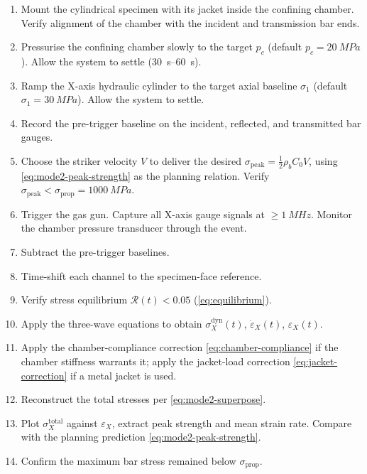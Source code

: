 \documentclass[11pt,a4paper,openany]{book}
\providecommand{\SI}[2]{\qty{#1}{#2}}
\providecommand{\SIrange}[3]{\qtyrange{#1}{#2}{#3}}
\theoremstyle{handbook}
\newcommand{\sig}{\sigma}
\newcommand{\eps}{\varepsilon}
\newcommand{\epsdot}{\dot\eps}
\newcommand{\Cz}{C_0}
\newcommand{\sigprop}{\sig_{\text{prop}}}
\newcommand{\sigpeak}{\sig_{\text{peak}}}
\begin{document}
\begin{stepbox}
\begin{enumerate}[leftmargin=*,itemsep=3pt]
  \item Mount the cylindrical specimen with its jacket inside the
        confining chamber. Verify alignment of the chamber with the
        incident and transmission bar ends.
  \item Pressurise the confining chamber slowly to the target $p_c$
        (default $p_c=\SI{20}{MPa}$). Allow the system to settle
        (\SIrange{30}{60}{s}).
  \item Ramp the X-axis hydraulic cylinder to the target axial baseline
        $\sig_1$ (default $\sig_1=\SI{30}{MPa}$). Allow the system to
        settle.
  \item Record the pre-trigger baseline on the incident, reflected, and
        transmitted bar gauges.
  \item Choose the striker velocity $V$ to deliver the desired
        $\sigpeak=\tfrac{1}{2}\rho_b\Cz V$, using
        \eqref{eq:mode2-peak-strength} as the planning relation.
        Verify $\sigpeak<\sigprop=\SI{1000}{MPa}$.
  \item Trigger the gas gun. Capture all X-axis gauge signals at
        $\ge\SI{1}{MHz}$. Monitor the chamber pressure transducer
        through the event.
  \item Subtract the pre-trigger baselines.
  \item Time-shift each channel to the specimen-face reference.
  \item Verify stress equilibrium $\mathcal{R}(t)<0.05$
        (\eqref{eq:equilibrium}).
  \item Apply the three-wave equations to obtain $\sig_X^{\text{dyn}}(t)$,
        $\epsdot_X(t)$, $\eps_X(t)$.
  \item Apply the chamber-compliance correction
        \eqref{eq:chamber-compliance} if the chamber stiffness warrants
        it; apply the jacket-load correction \eqref{eq:jacket-correction}
        if a metal jacket is used.
  \item Reconstruct the total stresses per \eqref{eq:mode2-superpose}.
  \item Plot $\sig_X^{\text{total}}$ against $\eps_X$, extract peak
        strength and mean strain rate. Compare with the planning
        prediction \eqref{eq:mode2-peak-strength}.
  \item Confirm the maximum bar stress remained below $\sigprop$.
\end{enumerate}
\end{stepbox}
\end{document}

